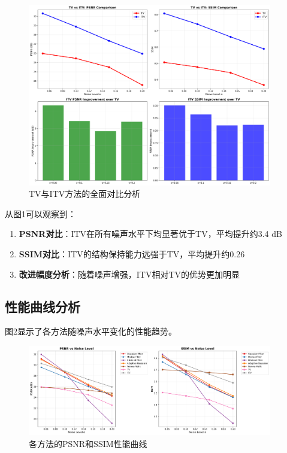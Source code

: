 \documentclass[a4paper,12pt]{ctexart}
\begin{document}
\begin{figure}[H]
\centering
\includegraphics[width=0.95\textwidth]{img/multi_noise_analysis_20250609_204619/tv_vs_itv_analysis.png}
\caption{TV与ITV方法的全面对比分析}
\label{fig:tv_itv}
\end{figure}

从图1可以观察到：

\begin{enumerate}
    \item \textbf{PSNR对比}：ITV在所有噪声水平下均显著优于TV，平均提升约3.4 dB
    \item \textbf{SSIM对比}：ITV的结构保持能力远强于TV，平均提升约0.26
    \item \textbf{改进幅度分析}：随着噪声增强，ITV相对TV的优势更加明显
\end{enumerate}

\subsection{性能曲线分析}

图2显示了各方法随噪声水平变化的性能趋势。

\begin{figure}[H]
\centering
\includegraphics[width=0.95\textwidth]{img/multi_noise_analysis_20250609_204619/performance_vs_noise_level.png}
\caption{各方法的PSNR和SSIM性能曲线}
\label{fig:performance}
\end{figure}
\end{document}
